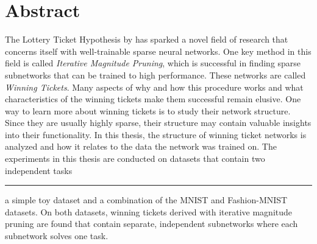 \chapter*{Abstract}

The Lottery Ticket Hypothesis by \textcite{LTH} has sparked a novel field of research that concerns itself with well-trainable sparse neural networks.
One key method in this field is called \textit{Iterative Magnitude Pruning}, which is successful in finding sparse subnetworks that can be trained to high performance. These networks are called \textit{Winning Tickets}.
Many aspects of why and how this procedure works and what characteristics of the winning tickets make them successful remain elusive.
One way to learn more about winning tickets is to study their network structure.
Since they are usually highly sparse, their structure may contain valuable insights into their functionality.
In this thesis, the structure of winning ticket networks is analyzed and how it relates to the data the network was trained on.
The experiments in this thesis are conducted on datasets that contain two independent tasks \rule[0.5ex]{.5em}{0.5pt} a simple toy dataset and a combination of the MNIST and Fashion-MNIST datasets.
On both datasets, winning tickets derived with iterative magnitude pruning are found that contain separate, independent subnetworks where each subnetwork solves one task.

